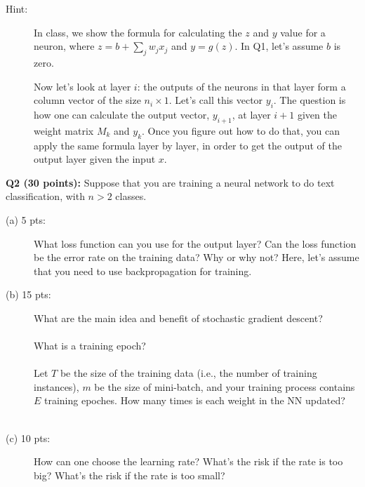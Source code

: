 \documentclass[11pt]{article}
\begin{document}
\begin{description}
\item [Hint:] In class, we show the formula for calculating the $z$ and $y$
  value for a neuron, where $z = b + \sum_j w_j x_j$ and $y=g(z)$.
  In Q1, let's assume $b$ is zero.
  
  Now let's look at layer $i$: the outputs of the neurons in that layer form
  a column vector of the size $n_i \times 1$. Let's call this vector $y_i$.
  The question is how one can calculate the output vector, $y_{i+1}$, at layer
  $i+1$ given the weight matrix $M_k$ and $y_k$. Once you figure out how
  to do that, you can apply the same formula layer by layer, in order
  to get the output of the output layer given the input $x$.

\end{description}  



\vspace{0.4in}
\noindent
{\bf Q2 (30 points):} Suppose that you are training a neural network to do text classification, with $n > 2$ classes.

\begin{description}
\item [(a) 5 pts:] What loss function can you use for the output layer?
  Can the loss function be the error rate on the training data? Why or why not?
  Here, let's assume that you need to use backpropagation for training.
  

\item [(b) 15 pts:] What are the main idea and benefit
  of stochastic gradient descent? \\ \\

  What is a training epoch? \\ \\

  Let $T$ be the size of the training data (i.e., the number of training
  instances), $m$ be the size of mini-batch,
  and your training process contains $E$ training epoches.
  How many times is each weight in the NN updated? \\ \\ 


\item [(c) 10 pts:] How can one choose the learning rate? What's the risk
  if the rate is too big? What's the risk if the rate is too
  small? \\ \\ 

\end{description}
\end{document}
